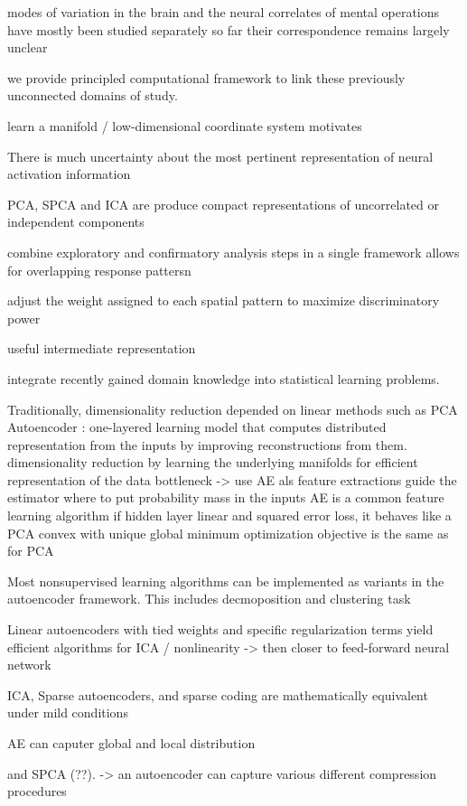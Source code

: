 \documentclass{article} %
\begin{document}
modes of variation in the brain and the neural correlates of mental
operations have mostly been studied separately so far
their correspondence remains largely unclear

we provide principled computational framework to link these previously
unconnected domains of study.

learn a manifold / low-dimensional coordinate system
motivates


There is much uncertainty about the most pertinent representation
of neural activation information

PCA, SPCA and ICA are produce compact representations of uncorrelated or
independent components

combine exploratory and confirmatory analysis steps in a single framework
allows for  overlapping response pattersn

adjust the weight assigned to each spatial pattern to maximize
discriminatory power

useful intermediate representation

integrate recently gained domain knowledge into statistical learning
problems.

Traditionally, dimensionality reduction depended on linear methods such as PCA
Autoencoder \cite{hinton06}:
one-layered learning model that computes distributed
representation from the inputs by improving reconstructions from them.
dimensionality reduction by learning the underlying manifolds
for efficient representation of the data
bottleneck
-> use AE als feature extractions
guide the estimator where to put probability mass in the inputs
AE is a common feature learning algorithm
if hidden layer linear and squared error loss, it behaves like a PCA \cite{baldi1989neural}
convex with unique global minimum
optimization objective is the same as for PCA

Most nonsupervised learning algorithms can be implemented as variants in the 
autoencoder framework. This includes decmoposition and clustering task


Linear autoencoders with tied weights and specific regularization terms
yield efficient algorithms for ICA / nonlinearity -> then closer to feed-forward neural network
\cite{le2011ica}

ICA, Sparse autoencoders, and sparse coding are mathematically equivalent
under mild conditions \cite{le2011ica}

AE can caputer global and local distribution

and SPCA (??).
-> an autoencoder can capture various different compression procedures
\end{document}
